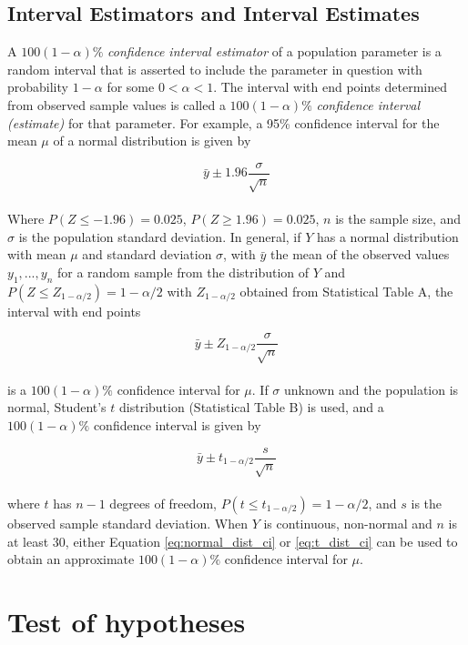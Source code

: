 \documentclass{WileySev}
\begin{document}
\subsection{Interval Estimators and Interval Estimates}

A $100(1-\alpha)\%$ \textit{confidence interval estimator} of a population parameter is a random interval that is asserted to include the parameter in question with probability $1-\alpha$ for some $0 < \alpha < 1$. The interval with end points determined from observed sample values is called a $100(1-\alpha)\%$ \textit{confidence interval (estimate)} for that parameter. For example, a 95\% confidence interval for the mean $\mu$ of a normal distribution is given by

\begin{equation}
\bar{y} \pm 1.96\frac{\sigma}{\sqrt{n}}
\end{equation}
\\
Where $P(Z\leq-1.96)=0.025$, $P(Z\geq1.96)=0.025$, $n$ is the sample size, and $\sigma$ is the population standard deviation. In general, if $Y$ has a normal distribution with mean $\mu$ and standard deviation $\sigma$, with $\bar{y}$ the mean of the observed values $y_1,...,y_n$ for a random sample from the distribution of $Y$ and $P(Z\leq Z_{1-\alpha/2})=1-\alpha/2$ with $Z_{1-\alpha/2}$ obtained from Statistical Table A, the interval with end points

\begin{equation}
\bar{y}\pm Z_{1-\alpha/2}\frac{\sigma}{\sqrt{n}}
\label{eq:normal_dist_ci}
\end{equation}
\\
is a $100(1-\alpha)\%$ confidence interval for $\mu$. If $\sigma$ unknown and the population is normal, Student’s $t$ distribution (Statistical Table B) is used, and a $100(1-\alpha)\%$ confidence interval is given by

\begin{equation}
\bar{y} \pm t_{1-\alpha/2}\frac{s}{\sqrt{n}}
\label{eq:t_dist_ci}
\end{equation}
\\
where $t$ has $n-1$ degrees of freedom, $P(t\leq t_{1-\alpha/2})=1-\alpha/2$, and $s$ is the observed sample standard deviation. When $Y$ is continuous, non-normal and $n$ is at least 30, either Equation \ref{eq:normal_dist_ci} or \ref{eq:t_dist_ci} can be used to obtain an approximate $100(1-\alpha)\%$ confidence interval for $\mu$.

\section{Test of hypotheses}
\end{document}
